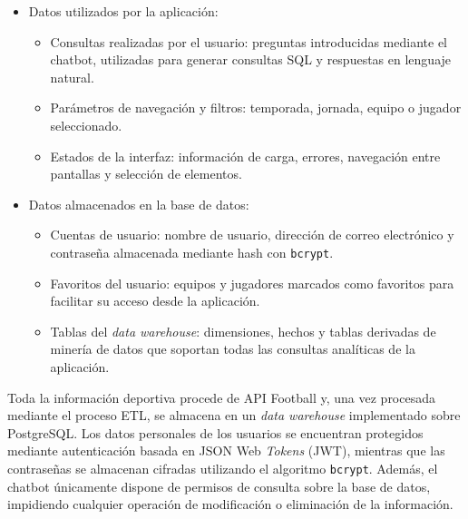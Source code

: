 \begin{itemize}
    \item Datos utilizados por la aplicación:
    \begin{itemize}
        \item Consultas realizadas por el usuario: preguntas introducidas mediante el chatbot, utilizadas para generar consultas SQL y respuestas en lenguaje natural.

        \item Parámetros de navegación y filtros: temporada, jornada, equipo o jugador seleccionado.

        \item Estados de la interfaz: información de carga, errores, navegación entre pantallas y selección de elementos.
    \end{itemize}

    \item Datos almacenados en la base de datos:
    \begin{itemize}
        \item Cuentas de usuario: nombre de usuario, dirección de correo electrónico y contraseña almacenada mediante hash con \texttt{bcrypt}.

        \item Favoritos del usuario: equipos y jugadores marcados como favoritos para facilitar su acceso desde la aplicación.

        \item Tablas del \textit{data warehouse}: dimensiones, hechos y tablas derivadas de minería de datos que soportan todas las consultas analíticas de la aplicación.
    \end{itemize}

\end{itemize}

Toda la información deportiva procede de API Football y, una vez procesada mediante el proceso ETL, se almacena en un \textit{data warehouse} implementado sobre PostgreSQL. Los datos personales de los usuarios se encuentran protegidos mediante autenticación basada en JSON Web \textit{Tokens} (JWT), mientras que las contraseñas se almacenan cifradas utilizando el algoritmo \texttt{bcrypt}. Además, el chatbot únicamente dispone de permisos de consulta sobre la base de datos, impidiendo cualquier operación de modificación o eliminación de la información.

